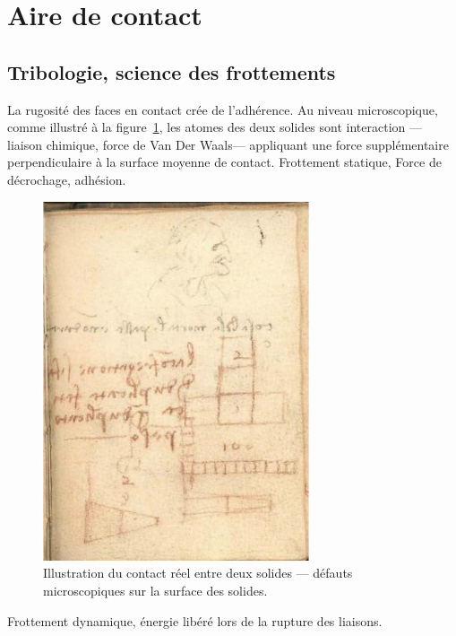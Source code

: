 \section{Aire de contact}

\subsection{Tribologie, science des frottements}

La rugosité des faces en contact crée de l'adhérence. Au niveau microscopique, comme illustré à la figure~\ref{contact_entre_2_solides}, les atomes des deux solides sont interaction --- liaison chimique, force de Van Der Waals--- appliquant une force supplémentaire perpendiculaire à la surface moyenne de contact. Frottement statique, Force de décrochage, adhésion.\par
 
\begin{figure}[!h]
\begin{center}
\includegraphics[width=0.7\textwidth]{Photos/LeonardDeVinci_friction_1} 
\end{center}
\caption{Illustration du contact réel entre deux solides --- défauts microscopiques sur la surface des solides.}
\label{contact_entre_2_solides}
\end{figure}

Frottement dynamique, énergie libéré lors de la rupture des liaisons.  

